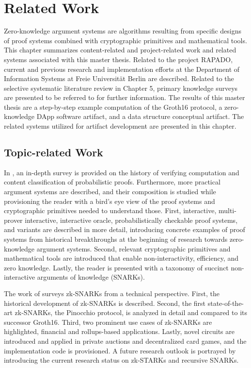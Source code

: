\chapter{Related Work}
Zero-knowledge argument systems are algorithms resulting from specific designs of proof systems combined with cryptographic primitives and mathematical tools. This chapter summarizes content-related and project-related work and related systems associated with this master thesis. Related to the project RAPADO, current and previous research and implementation efforts at the Department of Information Systems at Freie Universit{\"a}t Berlin are described. Related to the selective systematic literature review in Chapter 5, primary knowledge surveys are presented to be referred to for further information. The results of this master thesis are a step-by-step example computation of the Groth16 protocol, a zero-knowledge DApp software artifact, and a data structure conceptual artifact. The related systems utilized for artifact development are presented in this chapter.

\section{Topic-related Work}
In \citet{Thaler}, an in-depth survey is provided on the history of verifying computation and content classification of probabilistic proofs. Furthermore, more practical argument systems are described, and their composition is studied while provisioning the reader with a bird's eye view of the proof systems and cryptographic primitives needed to understand those. First, interactive, multi-prover interactive, interactive oracle, probabilistically checkable proof systems, and variants are described in more detail, introducing concrete examples of proof systems from historical breakthroughs at the beginning of research towards zero-knowledge argument systems. Second, relevant cryptographic primitives and mathematical tools are introduced that enable non-interactivity, efficiency, and zero knowledge. Lastly, the reader is presented with a taxonomy of succinct non-interactive arguments of knowledge (SNARKs).

The work of \citet{chen2022review} surveys zk-SNARKs from a technical perspective. First, the historical development of zk-SNARKs is described. Second, the first state-of-the-art zk-SNARKs, the Pinocchio protocol, is analyzed in detail and compared to its successor Groth16. Third, two prominent use cases of zk-SNARKs are highlighted, financial and rollups-based applications. Lastly, novel circuits are introduced and applied in private auctions and decentralized card games, and the implementation code is provisioned. A future research outlook is portrayed by introducing the current research status on zk-STARKs and recursive SNARKs.

